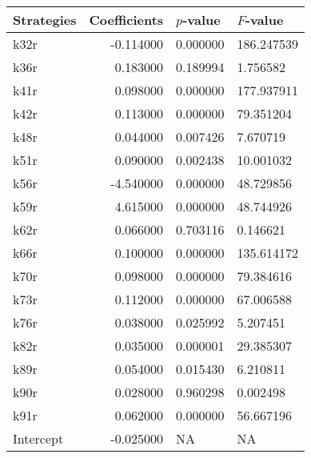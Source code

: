 \begin{tabular}{lrll}
\toprule
Strategies & Coefficients & $p$-value & $F$-value \\
\midrule
k32r & -0.114000 & 0.000000 & 186.247539 \\
k36r & 0.183000 & 0.189994 & 1.756582 \\
k41r & 0.098000 & 0.000000 & 177.937911 \\
k42r & 0.113000 & 0.000000 & 79.351204 \\
k48r & 0.044000 & 0.007426 & 7.670719 \\
k51r & 0.090000 & 0.002438 & 10.001032 \\
k56r & -4.540000 & 0.000000 & 48.729856 \\
k59r & 4.615000 & 0.000000 & 48.744926 \\
k62r & 0.066000 & 0.703116 & 0.146621 \\
k66r & 0.100000 & 0.000000 & 135.614172 \\
k70r & 0.098000 & 0.000000 & 79.384616 \\
k73r & 0.112000 & 0.000000 & 67.006588 \\
k76r & 0.038000 & 0.025992 & 5.207451 \\
k82r & 0.035000 & 0.000001 & 29.385307 \\
k89r & 0.054000 & 0.015430 & 6.210811 \\
k90r & 0.028000 & 0.960298 & 0.002498 \\
k91r & 0.062000 & 0.000000 & 56.667196 \\
Intercept & -0.025000 & NA & NA \\
\bottomrule
\end{tabular}

